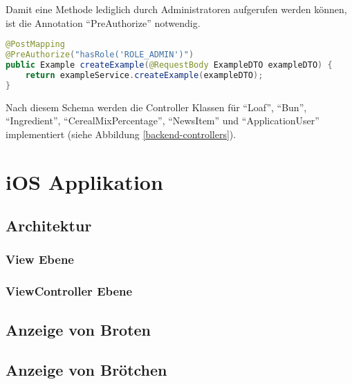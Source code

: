 Damit eine Methode lediglich durch Administratoren aufgerufen werden können, ist die Annotation \enquote{PreAuthorize} notwendig.
\begin{lstlisting}[language=Java]
@PostMapping
@PreAuthorize("hasRole('ROLE_ADMIN')")
public Example createExample(@RequestBody ExampleDTO exampleDTO) {
	return exampleService.createExample(exampleDTO);
}
\end{lstlisting}

Nach diesem Schema werden die Controller Klassen für \enquote{Loaf}, \enquote{Bun}, \enquote{Ingredient}, \enquote{CerealMixPercentage}, \enquote{NewsItem} und \enquote{ApplicationUser} implementiert (siehe Abbildung \ref{backend-controllers}). 

\clearpage


\clearpage

\section{iOS Applikation}

\subsection{Architektur}

\subsubsection{View Ebene}

\clearpage

\subsubsection{ViewController Ebene}

\clearpage

\subsection{Anzeige von Broten}

\clearpage

\subsection{Anzeige von Brötchen}

\clearpage

